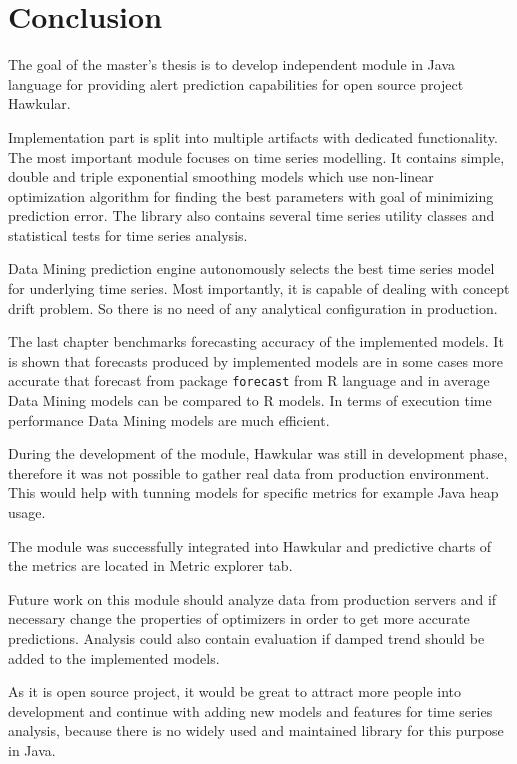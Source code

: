 \chapter{Conclusion} \label{chap:conclusion}
The goal of the master's thesis is to develop independent module in Java language for providing alert prediction
capabilities for open source project Hawkular.


Implementation part is split into multiple artifacts with dedicated functionality. The most important module
focuses on time series modelling. It contains simple, double and triple exponential smoothing models which
use non-linear optimization algorithm for finding the best parameters with goal of minimizing prediction error.
The library also contains several time series utility classes and statistical tests for time series analysis.

Data Mining prediction engine autonomously selects the best time series model for underlying time series. Most
importantly, it is capable of dealing with concept drift problem. So there is no need of any analytical configuration
in production.

The last chapter benchmarks forecasting accuracy of the implemented models. It is shown that forecasts produced by
implemented models are in some cases more accurate that forecast from package \texttt{forecast} from R language and
in average Data Mining models can be compared to R models. In terms of execution time performance Data Mining
models are much efficient.

During the development of the module, Hawkular was still in development phase, therefore it was not
possible to gather real data from production environment. This would help with tunning models for specific metrics
for example Java heap usage.

The module was successfully integrated into Hawkular and predictive charts of the metrics are located in Metric explorer
tab.

Future work on this module should analyze data from production servers and if necessary change the properties of
optimizers in order to get more accurate predictions. Analysis could also contain evaluation if damped trend should be
added to the implemented models.

As it is open source project, it would be great to attract more people into development and continue with adding new
models and features for time series analysis, because there is no widely used and maintained library for this purpose
in Java.

